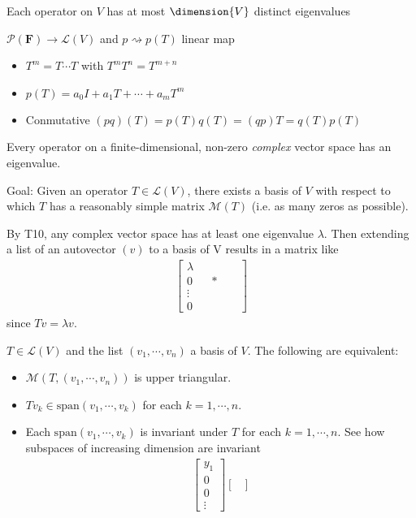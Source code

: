 \begin{description}
%
\item[C9] Each operator on $V$ has at most $\dimension{V}$ distinct eigenvalues
%
\item $\mathcal{P}(\mathbf{F})\to \mathcal{L}(V)$ and $p \rightsquigarrow p(T)$ linear map
\begin{itemize}
\item $T^m = T\cdots T$ with $T^mT^n = T^{m+n}$
\item $p(T)=a_0I+ a_1 T+ \cdots + a_m T^m$
\item Conmutative $(pq)(T) = p(T)q(T) = (qp)T = q(T)p(T)$
\end{itemize}  
\item[T10\label{itm:T5_10}] Every operator on a finite-dimensional, non-zero \emph{complex} vector space has an eigenvalue.
%
\item Goal: Given an operator $T\in\mathcal{L}(V)$, there exists a basis of $V$ with respect to which $T$ has a reasonably simple matrix $\mathcal{M}(T)$ (i.e. as many zeros as possible).
\item By T10, any complex vector space has at least one eigenvalue $\lambda$. Then extending a list of an autovector $(v)$ to a basis of V results in a matrix like
\begin{align*}
\begin{bmatrix}
\lambda &&  && \\
0  && *  && \\
\vdots && &&  \\
0 &&  && 
\end{bmatrix}
\end{align*}
since $Tv = \lambda v$.
\item[P12] $T\in\mathcal{L}(V)$ and the list $(v_1,\cdots,v_n)$ a basis of $V$. The following are equivalent:
\begin{itemize}
\item $\mathcal{M}(T,(v_1,\cdots,v_n))$ is upper triangular.
\item $Tv_k\in\mathrm{span}(v_1,\cdots,v_k)$ for each $k=1,\cdots, n$.
\item Each $\mathrm{span}(v_1,\cdots,v_k)$ is invariant under $T$ for each $k=1,\cdots, n$. See how subspaces of increasing dimension are invariant
\begin{align*}
\begin{bmatrix}
y_1\\
0 \\
0 \\
\vdots
\end{bmatrix}
\begin{bmatrix}

\end{bmatrix}
\end{align*}
\end{itemize}
\end{description}

